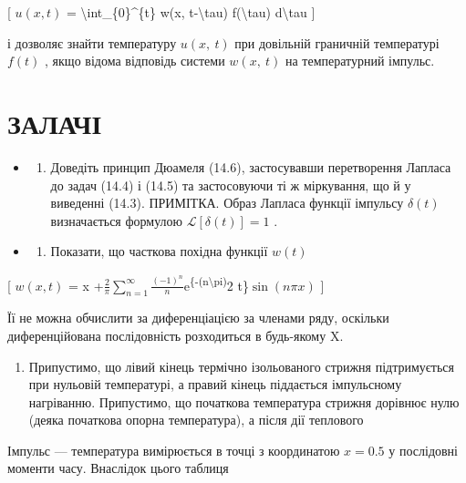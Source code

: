 \documentclass[
]{article}
\providecommand{\tightlist}{%
  \setlength{\itemsep}{0pt}\setlength{\parskip}{0pt}}
\begin{document}
{{{[} \(u(x, t)\) = \textbackslash int\_\{0\}\^{}\{t\} w(x,
t-\textbackslash tau) f(\textbackslash tau) d\textbackslash tau {]}

і дозволяє знайти температуру \(u\left(x,\ t\right)\) при довільній
граничній температурі \(f\left(t\right)\) , якщо відома відповідь
системи \(w\left(x,\ t\right)\) на температурний імпульс.

\section{ЗАЛАЧІ}\label{ux437ux430ux43bux430ux447ux456}

\begin{itemize}
\tightlist
\item
  \begin{enumerate}
  \def\labelenumi{\arabic{enumi}.}
  \tightlist
  \item
    Доведіть принцип Дюамеля (14.6), застосувавши перетворення Лапласа
    до задач (14.4) і (14.5) та застосовуючи ті ж міркування, що й у
    виведенні (14.3). ПРИМІТКА. Образ Лапласа функції імпульсу
    \(\delta(t)\) визначається формулою \(\mathscr{L}[\delta(t)] = 1\) .
  \end{enumerate}
\item
  \begin{enumerate}
  \def\labelenumi{\arabic{enumi}.}
  \setcounter{enumi}{1}
  \tightlist
  \item
    Показати, що часткова похідна функції \(w(t)\)
  \end{enumerate}
\end{itemize}

{[} \(w(x, t)\) = x
+\(\frac{2}{\pi} \sum_{n=1}^{\infty} \frac{(-1)^n}{n}\)e\textsuperscript{\{-(n\textbackslash pi)}2
t\}\(\sin(n\pi x)\) {]}

Її не можна обчислити за диференціацією за членами ряду, оскільки
диференційована послідовність розходиться в будь-якому X.

\begin{enumerate}
\def\labelenumi{\arabic{enumi}.}
\setcounter{enumi}{2}
\tightlist
\item
  Припустимо, що лівий кінець термічно ізольованого стрижня
  підтримується при нульовій температурі, а правий кінець піддається
  імпульсному нагріванню. Припустимо, що початкова температура стрижня
  дорівнює нулю (деяка початкова опорна температура), а після дії
  теплового
\end{enumerate}

Імпульс --- температура вимірюється в точці з координатою \(x\!=\!0.5\)
у послідовні моменти часу. Внаслідок цього таблиця

}}
\end{document}
